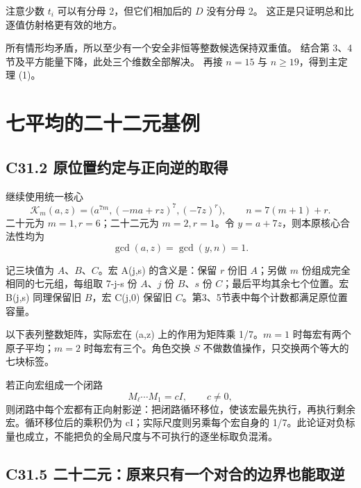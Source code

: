 \documentclass[11pt,a4paper]{article}
\theoremstyle{definition}
\numberwithin{equation}{section}
\begin{document}
{注意少数} {\ensuremath{t_{i}}} {可以有分母} {2，但它们相加后的} {\ensuremath{D}} {没有分母} {2。} {这正是只证明总和比逐值仿射格更有效的地方。}

{所有情形均矛盾，所以至少有一个安全非恒等整数候选保持双重值。} {结合第} {3、4} {节及平方能量下降，此处三个维数全部解决。} {再接} {\ensuremath{n=15}} {与} {\ensuremath{n\ge 19}，得到主定理} {(1)。}


\section{七平均的二十二元基例}\label{construct:seven-small}
\subsection*{\texorpdfstring{{C31.2} {原位置约定与正向逆的取得}}{C31.2 原位置约定与正向逆的取得}}\label{C31-h202}

{继续使用统一核心} \[
\mathcal K_m(a,z)=
\bigl(a^{7m},(-ma+rz)^7,(-7z)^r\bigr),
\qquad n=7(m+1)+r.
\] {二十元为} {\ensuremath{m=1,r=6}；二十二元为} {\ensuremath{m=2,r=1}。令} {\ensuremath{y=a+7z}，则本原核心合法性均为} \[
\gcd(a,z)=\gcd(y,n)=1.
\tag{C31.2}
\]

{记三块值为} {\ensuremath{A}、\ensuremath{B}、\ensuremath{C}。宏} {A(j,s)} {的含义是：保留} {\ensuremath{r}} {份旧} {\ensuremath{A}；另做} {\ensuremath{m}} {份组成完全相同的七元组，每组取} {7-j-s} {份} {\ensuremath{A}、\ensuremath{j}} {份} {\ensuremath{B}、\ensuremath{s}} {份} {\ensuremath{C}；最后平均其余七个位置。宏} {B(j,s)} {同理保留旧} {\ensuremath{B}，宏} {C(j,0)} {保留旧} {\ensuremath{C}。第3、5节表中每个计数都满足原位置容量。}

{以下表列整数矩阵，实际宏在} {(a,z)} {上的作用为矩阵乘} {1/7。\ensuremath{m=1}} {时每宏有两个原子平均；\ensuremath{m=2}} {时每宏有三个。角色交换} {\ensuremath{S}} {不做数值操作，只交换两个等大的七块标签。}

{若正向宏组成一个闭路} \[
M_\ell\cdots M_1=cI,\qquad c\ne0,
\tag{C31.3}
\] {则闭路中每个宏都有正向射影逆：把闭路循环移位，使该宏最先执行，再执行剩余宏。循环移位后的乘积仍为} {cI；实际尺度则另乘每个宏自身的} {1/7。此论证对负标量也成立，不能把负的全局尺度与不可执行的逐坐标取负混淆。}

\subsection*{\texorpdfstring{{C31.5} {二十二元：原来只有一个对合的边界也能取逆}}{C31.5 二十二元：原来只有一个对合的边界也能取逆}}\label{C31-h203}
\end{document}

